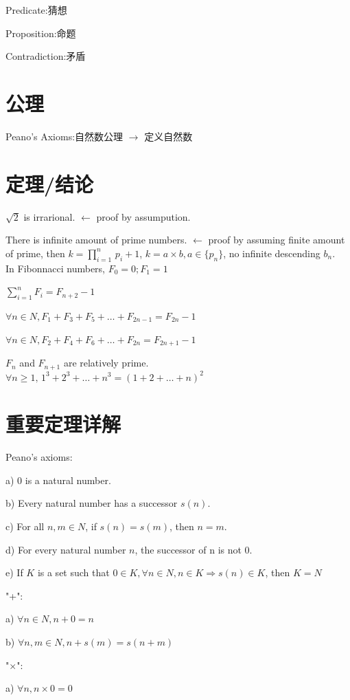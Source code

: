 \documentclass[12pt,a4paper]{ctexrep}
\begin{document}
Predicate:猜想

Proposition:命题

Contradiction:矛盾

\section{公理}
Peano's Axioms:自然数公理 $\rightarrow$ 定义自然数
\section{定理/结论}
$\sqrt 2$ is irrarional. $\leftarrow$ proof by assumpution.

There is infinite amount of prime numbers. $\leftarrow$ proof by assuming finite amount of prime, then $k = \prod_{i=1}^{n}\, p_{i} + 1$, $k = a \times b, a \in \{p_{n}\}$, no infinite descending {$b_{n}$}.\\

\noindent In Fibonnacci numbers, $F_{0} = 0; F_{1} = 1$

$\sum_{i = 1}^{n} F_{i} = F_{n+2}-1$

$\forall n \in N, F_{1}+F_{3}+F_{5}+\dots +F_{2n-1} = F_{2n}-1$

$\forall n \in N, F_{2}+F_{4}+F_{6}+\dots +F_{2n} = F_{2n+1}-1$

$F_{n}$ and $F_{n+1}$ are relatively prime.\\

\noindent $\forall n \geq 1, \, 1^{3}+2^{3}+\dots + n^{3} = (1+2+ \dots +n)^{2}$
\section{重要定理详解}
\noindent Peano's axioms: 

a) 0 is a natural number. 

b) Every natural number has a successor $s(n)$. 

c) For all $n,m \in N$, if $s(n) = s(m)$, then $n = m$. 

d) For every natural number $n$, the successor of n is not 0. 

e) If $K$ is a set such that $0 \in K, \forall n \in N, n \in K \Rightarrow s(n) \in K$, then $K = N$

\noindent "+":

a) $\forall n \in N, n+0 = n$

b) $\forall n,m \in N, n+s(m) = s(n+m)$

\noindent "$\times$":

a) $\forall n, n\times 0 = 0$
\end{document}
